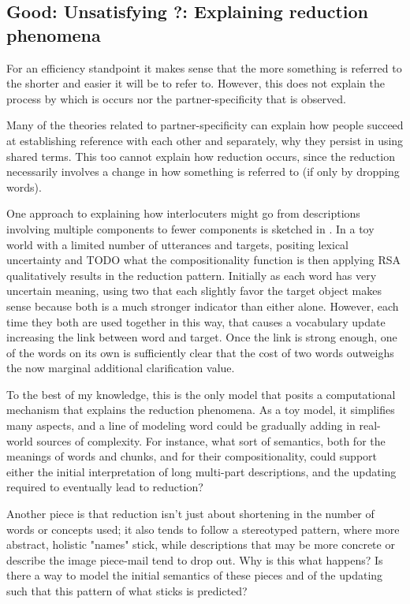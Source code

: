 \documentclass[]{article}
\begin{document}

\subsection{Good: Unsatisfying ?: Explaining reduction phenomena}

For an efficiency standpoint it makes sense that the more something is referred to the shorter and easier it will be to refer to. However, this does not explain the process by which is occurs nor the partner-specificity that is observed. 

Many of the theories related to partner-specificity can explain how people succeed at establishing reference with each other and separately, why they persist in using shared terms. This too cannot explain how reduction occurs, since the reduction necessarily involves a change in how something is referred to (if only by dropping words). 

One approach to explaining how interlocuters might go from descriptions involving multiple components to fewer components is sketched in \cite{hawkins2021}. In a toy world with a limited number of utterances and targets, positing lexical uncertainty and TODO what the compositionality function is then applying RSA qualitatively results in the reduction pattern. Initially as each word has very uncertain meaning, using two that each slightly favor the target object makes sense because both is a much stronger indicator than either alone. However, each time they both are used together in this way, that causes a vocabulary update increasing the link between word and target. Once the link is strong enough, one of the words on its own is sufficiently clear that the cost of two words outweighs the now marginal additional clarification value. 

To the best of my knowledge, this is the only model that posits a computational mechanism that explains the reduction phenomena. As a toy model, it simplifies many aspects, and a line of modeling word could be gradually adding in real-world sources of complexity. For instance, what sort of semantics, both for the meanings of words and chunks, and for their compositionality, could support either the initial interpretation of long multi-part descriptions, and the updating required to eventually lead to reduction? 

Another piece is that reduction isn't just about shortening in the number of words or concepts used; it also tends to follow a stereotyped pattern, where more abstract, holistic "names" stick, while descriptions that may be more concrete or describe the image piece-mail tend to drop out. Why is this what happens?  Is there a way to model the initial semantics of these pieces and of the updating such that this pattern of what sticks is predicted? 
\end{document}
